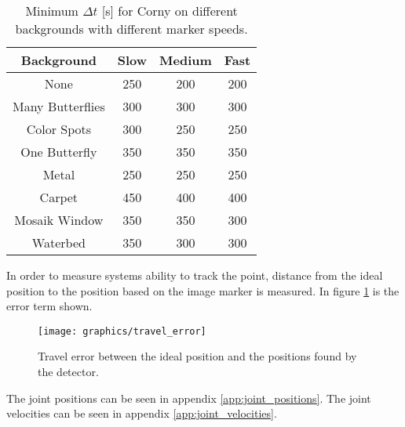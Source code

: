 
\begin{table}[H]
\center
\begin{tabular}{|c|c|c|c|}
\hline
Background & Slow & Medium & Fast \\ \hline
None & 250 & 200 & 200\\ \hline 
Many Butterflies & 300 & 300 & 300\\ \hline 
Color Spots & 300 & 250 & 250\\ \hline 
One Butterfly & 350 & 350 & 350\\ \hline 
Metal & 250 & 250 & 250\\ \hline 
Carpet & 450 & 400 & 400\\ \hline 
Mosaik Window & 350 & 350 & 300\\ \hline 
Waterbed & 350 & 300 & 300\\ \hline 
\end{tabular}
\caption{Minimum $\Delta t$ [s] for Corny on different backgrounds with different marker speeds.}
\label{tb:min_dt_corny}
\end{table}

In order to measure systems ability to track the point, distance from the ideal position to the position based on the image marker is measured.
In figure \ref{fig:travel_error} is the error term shown.

\begin{figure}
 \centering
 \texttt{[image: graphics/travel\_error]} %
 \caption{Travel error between the ideal position and the positions found by the detector.}
 \label{fig:travel_error}
\end{figure}

The joint positions can be seen in appendix \ref{app:joint_positions}.
The joint velocities can be seen in appendix \ref{app:joint_velocities}.
